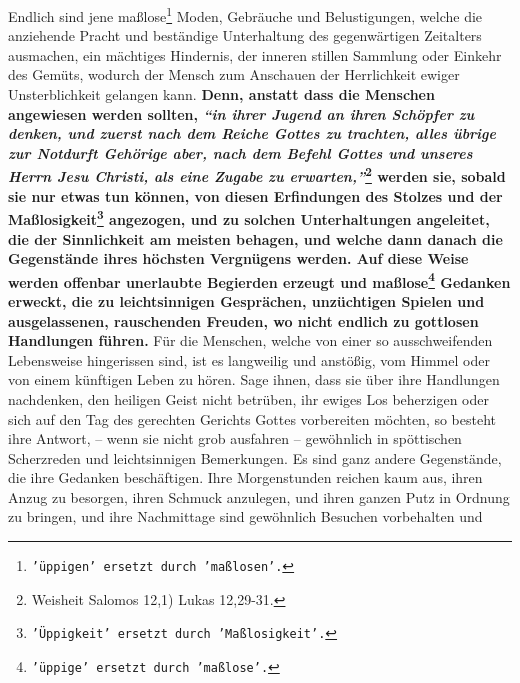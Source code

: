 Endlich sind jene
maßlose\footnote{\texttt{'üppigen' ersetzt durch 'maßlosen'.}} Moden, Gebräuche
und Belustigungen, welche die
anziehende Pracht und beständige Unterhaltung des gegenwärtigen Zeitalters
ausmachen, ein mächtiges Hindernis, der inneren stillen
Sammlung oder Einkehr des
Gemüts, wodurch der Mensch zum Anschauen der Herrlichkeit ewiger
Unsterblichkeit gelangen kann.
\label{ref:17_01_erziehung}
\textbf{Denn, anstatt dass die Menschen angewiesen werden
sollten,
\textit{"`in ihrer Jugend an ihren Schöpfer zu denken, und zuerst nach dem
Reiche Gottes zu trachten, alles übrige zur Notdurft
Gehörige aber, nach dem
Befehl Gottes und unseres Herrn Jesu Christi, als eine Zugabe zu
erwarten,"'}\footnote{Weisheit Salomos 12,1) Lukas 12,29-31.}
werden sie, sobald sie nur
etwas tun können, von diesen Erfindungen des Stolzes und der
Maßlosigkeit\footnote{\texttt{'Üppigkeit' ersetzt durch 'Maßlosigkeit'.}}
angezogen, und zu solchen Unterhaltungen angeleitet, die der Sinnlichkeit am
meisten behagen, und welche dann danach die Gegenstände ihres höchsten
Vergnügens werden. Auf diese Weise werden offenbar unerlaubte Begierden erzeugt
und maßlose\footnote{\texttt{'üppige' ersetzt durch 'maßlose'.}} Gedanken
erweckt, die zu
leichtsinnigen Gesprächen, unzüchtigen
Spielen und ausgelassenen, rauschenden Freuden, wo nicht endlich zu gottlosen
Handlungen führen.} Für die Menschen, welche von einer so ausschweifenden
Lebensweise hingerissen sind, ist es langweilig und anstößig, vom Himmel oder
von einem künftigen Leben zu hören. Sage ihnen, dass sie über ihre Handlungen
nachdenken, den heiligen Geist nicht betrüben, ihr ewiges
Los beherzigen oder
sich auf den Tag des gerechten Gerichts Gottes
vorbereiten möchten, so besteht
ihre Antwort, -- wenn sie nicht grob ausfahren -- gewöhnlich in spöttischen
Scherzreden und leichtsinnigen Bemerkungen. Es sind ganz andere Gegenstände, die
ihre Gedanken beschäftigen. Ihre Morgenstunden reichen kaum aus, ihren Anzug zu
besorgen, ihren Schmuck anzulegen, und ihren ganzen Putz in Ordnung zu bringen,
und ihre Nachmittage sind gewöhnlich Besuchen vorbehalten und
\label{ref:17_01_schauspiel}
